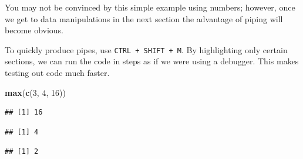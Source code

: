 \documentclass[]{book}
\newenvironment{Shaded}{\begin{snugshade}}{\end{snugshade}}
\newcommand{\DecValTok}[1]{\textcolor[rgb]{0.00,0.00,0.81}{#1}}
\newcommand{\KeywordTok}[1]{\textcolor[rgb]{0.13,0.29,0.53}{\textbf{#1}}}
\newcommand{\NormalTok}[1]{#1}
\newcommand{\OperatorTok}[1]{\textcolor[rgb]{0.81,0.36,0.00}{\textbf{#1}}}
\newcommand{\StringTok}[1]{\textcolor[rgb]{0.31,0.60,0.02}{#1}}
\begin{document}
You may not be convinced by this simple example using numbers; however, once we get to data manipulations in the next section the advantage of piping will become obvious.

To quickly produce pipes, use \texttt{CTRL\ +\ SHIFT\ +\ M}. By highlighting only certain sections, we can run the code in steps as if we were using a debugger. This makes testing out code much faster.

\begin{Shaded}
\begin{Highlighting}[]
\KeywordTok{max}\NormalTok{(}\KeywordTok{c}\NormalTok{(}\DecValTok{3}\NormalTok{, }\DecValTok{4}\NormalTok{, }\DecValTok{16}\NormalTok{))}
\end{Highlighting}
\end{Shaded}

\begin{verbatim}
## [1] 16
\end{verbatim}

\begin{Shaded}
\end{Shaded}

\begin{verbatim}
## [1] 4
\end{verbatim}

\begin{Shaded}
\end{Shaded}

\begin{verbatim}
## [1] 2
\end{verbatim}

\begin{Shaded}
\end{Shaded}
\end{document}
